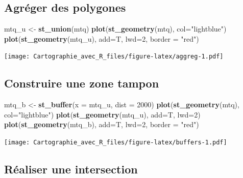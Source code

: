 \documentclass[]{book}
\newenvironment{Shaded}{\begin{snugshade}}{\end{snugshade}}
\newcommand{\KeywordTok}[1]{\textcolor[rgb]{0.13,0.29,0.53}{\textbf{#1}}}
\newcommand{\DataTypeTok}[1]{\textcolor[rgb]{0.13,0.29,0.53}{#1}}
\newcommand{\DecValTok}[1]{\textcolor[rgb]{0.00,0.00,0.81}{#1}}
\newcommand{\StringTok}[1]{\textcolor[rgb]{0.31,0.60,0.02}{#1}}
\newcommand{\NormalTok}[1]{#1}
\begin{document}
\subsection{Agréger des polygones}\label{agreger-des-polygones}

\begin{Shaded}
\begin{Highlighting}[]
\NormalTok{mtq_u <-}\StringTok{ }\KeywordTok{st_union}\NormalTok{(mtq)}
\KeywordTok{plot}\NormalTok{(}\KeywordTok{st_geometry}\NormalTok{(mtq), }\DataTypeTok{col=}\StringTok{"lightblue"}\NormalTok{)}
\KeywordTok{plot}\NormalTok{(}\KeywordTok{st_geometry}\NormalTok{(mtq_u), }\DataTypeTok{add=}\NormalTok{T, }\DataTypeTok{lwd=}\DecValTok{2}\NormalTok{, }\DataTypeTok{border =} \StringTok{"red"}\NormalTok{)}
\end{Highlighting}
\end{Shaded}

\texttt{[image: Cartographie\_avec\_R\_files/figure-latex/aggreg-1.pdf]}

\subsection{Construire une zone
tampon}\label{construire-une-zone-tampon}

\begin{Shaded}
\begin{Highlighting}[]
\NormalTok{mtq_b <-}\StringTok{ }\KeywordTok{st_buffer}\NormalTok{(}\DataTypeTok{x =}\NormalTok{ mtq_u, }\DataTypeTok{dist =} \DecValTok{2000}\NormalTok{)}
\KeywordTok{plot}\NormalTok{(}\KeywordTok{st_geometry}\NormalTok{(mtq), }\DataTypeTok{col=}\StringTok{"lightblue"}\NormalTok{)}
\KeywordTok{plot}\NormalTok{(}\KeywordTok{st_geometry}\NormalTok{(mtq_u), }\DataTypeTok{add=}\NormalTok{T, }\DataTypeTok{lwd=}\DecValTok{2}\NormalTok{)}
\KeywordTok{plot}\NormalTok{(}\KeywordTok{st_geometry}\NormalTok{(mtq_b), }\DataTypeTok{add=}\NormalTok{T, }\DataTypeTok{lwd=}\DecValTok{2}\NormalTok{, }\DataTypeTok{border =} \StringTok{"red"}\NormalTok{)}
\end{Highlighting}
\end{Shaded}

\texttt{[image: Cartographie\_avec\_R\_files/figure-latex/buffers-1.pdf]}

\subsection{Réaliser une intersection}\label{realiser-une-intersection}
\end{document}
